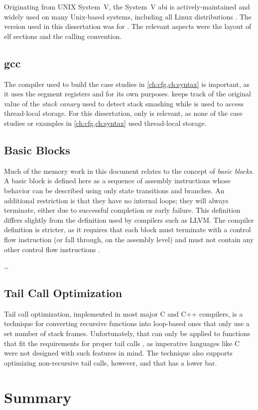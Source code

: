 Originating from UNIX System~V, the System~V \ac{abi}
is actively-maintained and widely used on many Unix-based systems,
including all Linux distributions \autocite{systemv-ABI-git}.
The version used in this dissertation was for \arch.
The relevant aspects were the layout of \ac{elf} sections and the calling convention.

\subsection{\Ac{gcc}}
The compiler used to build the case studies in \cref{ch:cfg,ch:syntax} is important,
as it uses the segment registers  and  for its own purposes.
 keeps track of the original value of the \emph{stack canary}
used to detect stack smashing \autocite{cowan1998stackguard}
while  is used to access thread-local storage.
For this dissertation, only  is relevant, as none of the case studies
or examples in \cref{ch:cfg,ch:syntax} used thread-local storage.

\subsection{Basic Blocks}
Much of the memory work in this document relates to the concept of \emph{basic blocks}.%
A basic block is defined here as a sequence of assembly instructions
whose behavior can be described using only state transitions and branches.
An additional restriction is that they have no internal loops;
they will always terminate, either due to successful completion or early failure.
This definition differs slightly from the definition used by compilers such as LLVM.
The compiler definition is stricter, as it requires that
each block must terminate with a control flow instruction
(or fall through, on the assembly level)
and must not contain any other control flow instructions
\autocite{llvm:functions,llvm:terminators}.

\todo\dots

\subsection{Tail Call Optimization}
Tail call%
optimization, implemented in most major C and C++ compilers, is a technique
for converting recursive functions into loop-based ones that only use
a set number of stack frames.
Unfortunately, that can only be applied to functions that fit the requirements
for proper tail calls \autocite{probst2001proper},
as imperative languages like C were not designed with such features in mind.
The technique also supports optimizing non-recursive tail calls, however,
and that has a lower bar.

\section{Summary}
